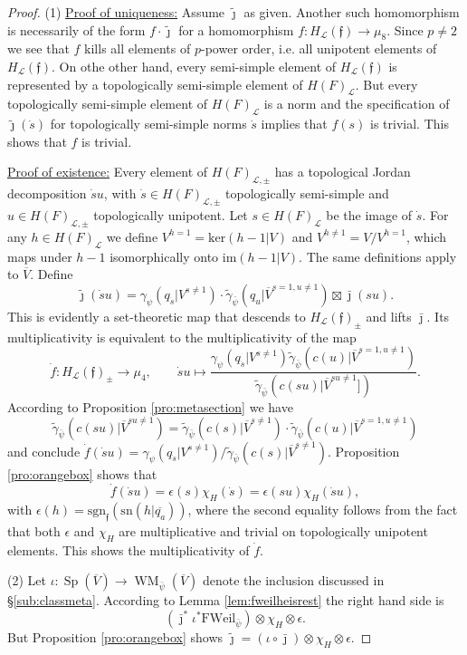 \documentclass{article}
\def\mc#1{\mathcal{#1}}
\def\tx#1{\textrm{#1}}
\def\ol#1{\overline{#1}}
\DeclareMathOperator{\Sp}{Sp}
\theoremstyle{definition}
\numberwithin{equation}{subsection}
\renewcommand{\-}{\hyp{}}
\DeclareMathOperator{\WM}{WM}
\newcommand{\rf}{\mathfrak{f}}
\newcommand{\oV}{\ol{V}}
\newcommand{\oVS}{\overline{V}}
\begin{document}
\begin{proof}
	(1) \underline{Proof of uniqueness:} Assume $\tilde\jmath$ as given. Another such homomorphism is necessarily of the form $f \cdot \tilde\jmath$ for a homomorphism $f : H_\mc{L}(\rf) \to \mu_8$. Since $p \neq 2$ we see that $f$ kills all elements of $p$-power order, i.e. all unipotent elements of $H_\mc{L}(\rf)$. On othe other hand, every semi-simple element of $H_\mc{L}(\rf)$ is represented by a topologically semi-simple element of $H(F)_\mc{L}$. But every topologically semi-simple element of $H(F)_\mc{L}$ is a norm and the specification of $\tilde\jmath(\dot s)$ for topologically semi-simple norms $\dot s$ implies that $f(s)$ is trivial. This shows that $f$ is trivial.

	\underline{Proof of existence:} Every element of $H(F)_{\mc{L},\pm}$ has a topological Jordan decomposition $\dot su$, with $\dot s \in H(F)_{\mc{L},\pm}$ topologically semi-simple and $u \in H(F)_{\mc{L},\pm}$ topologically unipotent. Let $s \in H(F)_\mc{L}$ be the image of $\dot s$. For any $h \in H(F)_{\mc{L}}$ we define $V^{h=1}=\tx{ker}(h-1|V)$ and $V^{h \neq 1}=V/V^{h=1}$, which maps under $h-1$ isomorphically onto $\tx{im}(h-1|V)$. The same definitions apply to $\oVS$.
	Define
	\begin{equation} \label{eq:tildejansatz}
		\tilde \jmath(\dot su)=\gamma_\psi(q_{\dot s}|V^{s \neq 1}) \cdot \tilde\gamma_{\bar\psi}(q_u|\oVS^{s=1,u \neq 1}) \boxtimes \bar\jmath(su).
	\end{equation}
	This is evidently a set-theoretic map that descends to $H_\mc{L}(\rf)_\pm$ and lifts $\bar\jmath$. Its multiplicativity is equivalent to the multiplicativity of the map 
	\[ \dot f : H_\mc{L}(\rf)_\pm \to \mu_4,\qquad \dot su \mapsto \frac{\gamma_\psi(q_{\dot s}|V^{s \neq 1})\tilde\gamma_{\bar\psi}(c(u)|\oVS^{s=1,u \neq 1})}{\tilde\gamma_{\bar\psi}(c(su)|\oVS^{su \neq 1}])}. \]
	According to Proposition \ref{pro:metasection} we have
	\[ \tilde\gamma_{\bar\psi}(c(su)|\oVS^{su \neq 1}) = \tilde\gamma_{\bar\psi}(c(s)|\oVS^{s \neq 1}) \cdot \tilde\gamma_{\bar\psi}(c(u)|\oVS^{s=1,u \neq 1}) \] 
	and conclude $\dot f(\dot su)=\gamma_\psi(q_{\dot s}|V^{s \neq 1})/\tilde\gamma_{\bar\psi}(c(s)|\oVS^{s \neq 1})$. Proposition \ref{pro:orangebox} shows that 
	\[ \dot f(\dot su) = \epsilon(s)\chi_H(\dot s) = \epsilon(su)\chi_H(\dot su), \]
	with $\epsilon(h)=\tx{sgn}_\rf(\tx{sn}(h|\ol{q_a}))$, 
	where the second equality follows from the fact that both $\epsilon$ and $\chi_H$ are multiplicative and trivial on topologically unipotent elements. This shows the multiplicativity of $\dot f$. 

	(2) Let $\iota : \Sp(\oV) \to \WM_{\bar\psi}(\oV)$ denote the inclusion discussed in \S\ref{sub:classmeta}. According to Lemma \ref{lem:fweilheisrest} the right hand side is 
	\[ (\bar\jmath^*\iota^*\mathrm{FWeil}_{\bar\psi}) \otimes \chi_H \otimes \epsilon. \]
	But Proposition \ref{pro:orangebox} shows $\tilde\jmath = (\iota \circ \bar\jmath) \otimes \chi_H \otimes \epsilon$.
\end{proof}
\end{document}
